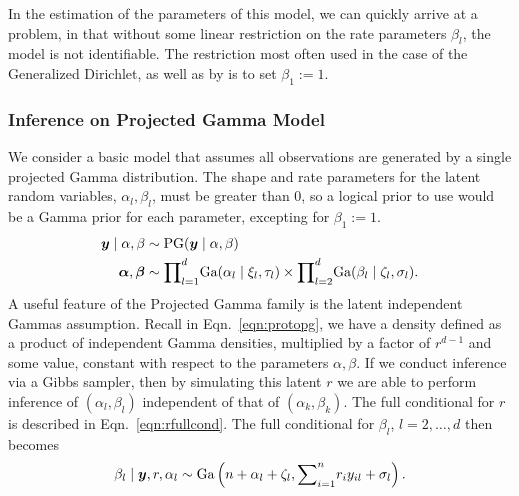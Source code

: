 In the estimation of the parameters of this model, we can quickly arrive at a problem, in that
  without some linear restriction on the rate parameters $\beta_l$, the model is not identifiable.
  The restriction most often used in the case of the Generalized Dirichlet, as well as by
  \cite{nunez2019} is to set $\beta_1 := 1$.

\subsubsection{Inference on Projected Gamma Model}
We consider a basic model that assumes all observations are generated by a single projected Gamma
  distribution.  The shape and rate parameters for the latent  random variables,
  $\alpha_l,\beta_l$, must be greater than 0, so a logical prior to use would be a Gamma prior for
  each parameter, excepting for $\beta_1 := 1$.
  \begin{equation}
    \label{eqn:vanillap}
    \begin{aligned}
      \bm{ y}\mid\alpha,\beta &\sim \text{PG}(\bm{ y}\mid\alpha,\beta)\\
      \bm{ \alpha},\bm{\beta} &\sim {\small \prod}_{l = 1}^d \text{Ga}(\alpha_l \mid \xi_l,\tau_l)
              \times {\small \prod}_{l = 2}^d \text{Ga}(\beta_l\mid \zeta_l,\sigma_l).
    \end{aligned}
  \end{equation}
  A useful feature of the Projected Gamma family is the latent independent Gammas assumption.  Recall
  in Eqn.~\ref{eqn:protopg}, we have a density defined as a product of independent Gamma densities,
  multiplied by a factor of $r^{d-1}$ and some value, constant with respect to the parameters
  $\alpha,\beta$.  If we conduct inference via a Gibbs sampler, then by simulating this latent $r$
  we are able to perform inference of $(\alpha_l,\beta_l)$ independent of that of $(\alpha_k,\beta_k)$.
  The full conditional for $r$ is described in Eqn.~\ref{eqn:rfullcond}.  The full conditional for
  $\beta_l$, $l = 2,\ldots,d$ then becomes
  \begin{equation}
    \label{eqn:betafc}
    \beta_l\mid \bm{ y}, r, \alpha_l \sim \text{Ga}\left(n + \alpha_l + \zeta_l,
                                      {\small \sum}_{i = 1}^nr_iy_{il} + \sigma_l\right).
  \end{equation}
